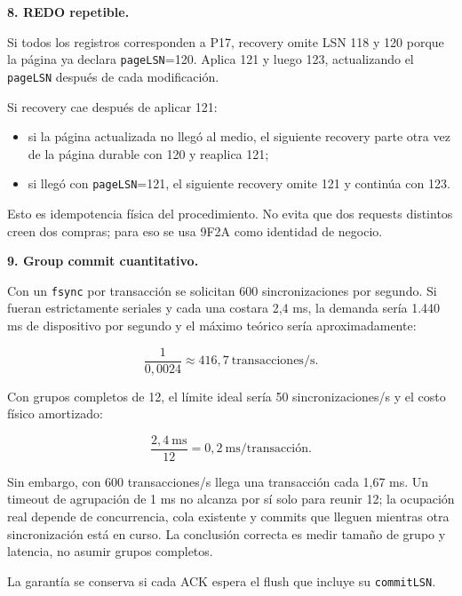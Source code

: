 \documentclass[variant=guiaresuelta,cover=institutional,mode=screen]{ua-engineering-v6-article}
\begin{document}
\begin{uaexercise}
\textbf{8. REDO repetible.}
\end{uaexercise}
\begin{uaanswer}
Si todos los registros corresponden a P17, recovery omite LSN 118 y 120 porque la página ya declara \texttt{pageLSN}=120. Aplica 121 y luego 123, actualizando el \texttt{pageLSN} después de cada modificación.

Si recovery cae después de aplicar 121:

\begin{itemize}
\item si la página actualizada no llegó al medio, el siguiente recovery parte otra vez de la página durable con 120 y reaplica 121;
\item si llegó con \texttt{pageLSN}=121, el siguiente recovery omite 121 y continúa con 123.
\end{itemize}

Esto es idempotencia física del procedimiento. No evita que dos requests distintos creen dos compras; para eso se usa 9F2A como identidad de negocio.
\end{uaanswer}

\begin{uaexercise}
\textbf{9. Group commit cuantitativo.}
\end{uaexercise}
\begin{uaanswer}
Con un \texttt{fsync} por transacción se solicitan 600 sincronizaciones por segundo. Si fueran estrictamente seriales y cada una costara 2,4 ms, la demanda sería 1.440 ms de dispositivo por segundo y el máximo teórico sería aproximadamente:

\[
\frac{1}{0{,}0024} \approx 416{,}7\ \text{transacciones/s}.
\]

Con grupos completos de 12, el límite ideal sería 50 sincronizaciones/s y el costo físico amortizado:

\[
\frac{2{,}4\ \text{ms}}{12}=0{,}2\ \text{ms/transacción}.
\]

Sin embargo, con 600 transacciones/s llega una transacción cada 1,67 ms. Un timeout de agrupación de 1 ms no alcanza por sí solo para reunir 12; la ocupación real depende de concurrencia, cola existente y commits que lleguen mientras otra sincronización está en curso. La conclusión correcta es medir tamaño de grupo y latencia, no asumir grupos completos.

La garantía se conserva si cada ACK espera el flush que incluye su \texttt{commitLSN}.
\end{uaanswer}
\end{document}
